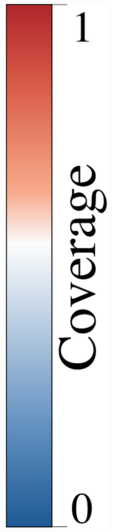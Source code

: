 \documentclass[runningheads]{llncs}%
\begin{document}
\begin{figure}
\begin{subfigure}[b]{.03\textwidth}
        {\includegraphics[width=\textwidth]{figs/cbar/cbar_distribution.pdf}}     

\end{subfigure}
\end{figure}
\end{document}
